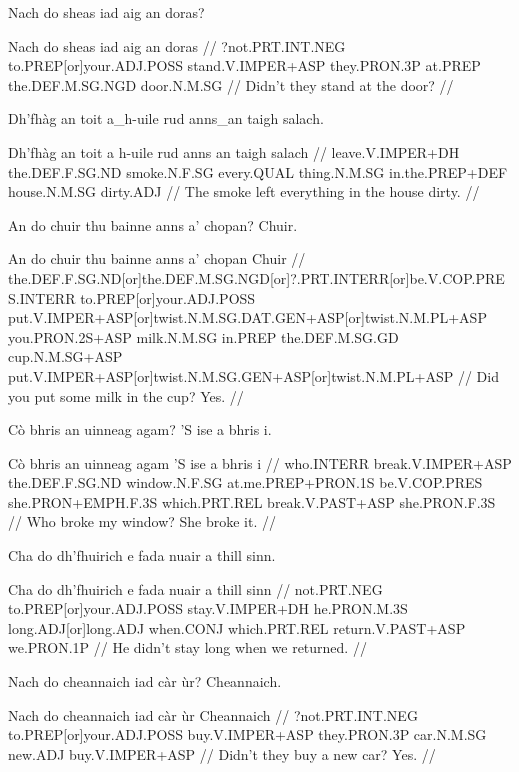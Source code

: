 \documentclass[a4paper,10pt]{article}
\begin{document}
\ex
\begingl
\glpre Nach do sheas iad aig an doras? 

\vspace{4mm}
\gla Nach do sheas iad aig an doras  //
\glb ?not.PRT.INT.NEG to.PREP[or]your.ADJ.POSS stand.V.IMPER+ASP they.PRON.3P at.PREP the.DEF.M.SG.NGD door.N.M.SG  //
\glft Didn't they stand at the door? //
\endgl
\xe

\ex
\begingl
\glpre Dh'fhàg an toit a\_h-uile rud anns\_an taigh salach. 

\vspace{4mm}
\gla Dh'fhàg an toit {a h-uile} rud {anns an} taigh salach  //
\glb leave.V.IMPER+DH the.DEF.F.SG.ND smoke.N.F.SG every.QUAL thing.N.M.SG in.the.PREP+DEF house.N.M.SG dirty.ADJ  //
\glft The smoke left everything in the house dirty. //
\endgl
\xe

\ex
\begingl
\glpre An do chuir thu bainne anns a' chopan? Chuir. 

\vspace{4mm}
\gla An do chuir thu bainne anns a' chopan Chuir  //
\glb the.DEF.F.SG.ND[or]the.DEF.M.SG.NGD[or]?.PRT.INTERR[or]be.V.COP.PRES.INTERR to.PREP[or]your.ADJ.POSS put.V.IMPER+ASP[or]twist.N.M.SG.DAT.GEN+ASP[or]twist.N.M.PL+ASP you.PRON.2S+ASP milk.N.M.SG in.PREP the.DEF.M.SG.GD cup.N.M.SG+ASP put.V.IMPER+ASP[or]twist.N.M.SG.GEN+ASP[or]twist.N.M.PL+ASP  //
\glft Did you put some milk in the cup? Yes. //
\endgl
\xe

\ex
\begingl
\glpre Cò bhris an uinneag agam? 'S ise a bhris i. 

\vspace{4mm}
\gla Cò bhris an uinneag agam 'S ise a bhris i  //
\glb who.INTERR break.V.IMPER+ASP the.DEF.F.SG.ND window.N.F.SG at.me.PREP+PRON.1S be.V.COP.PRES she.PRON+EMPH.F.3S which.PRT.REL break.V.PAST+ASP she.PRON.F.3S  //
\glft Who broke my window? She broke it. //
\endgl
\xe

\ex
\begingl
\glpre Cha do dh'fhuirich e fada nuair a thill sinn. 

\vspace{4mm}
\gla Cha do dh'fhuirich e fada nuair a thill sinn  //
\glb not.PRT.NEG to.PREP[or]your.ADJ.POSS stay.V.IMPER+DH he.PRON.M.3S long.ADJ[or]long.ADJ when.CONJ which.PRT.REL return.V.PAST+ASP we.PRON.1P  //
\glft He didn't stay long when we returned. //
\endgl
\xe

\ex
\begingl
\glpre Nach do cheannaich iad càr ùr? Cheannaich. 

\vspace{4mm}
\gla Nach do cheannaich iad càr ùr Cheannaich  //
\glb ?not.PRT.INT.NEG to.PREP[or]your.ADJ.POSS buy.V.IMPER+ASP they.PRON.3P car.N.M.SG new.ADJ buy.V.IMPER+ASP  //
\glft Didn't they buy a new car? Yes. //
\endgl
\xe
\end{document}
